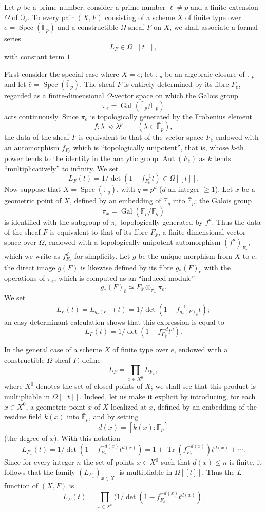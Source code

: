 \documentclass[11pt]{article}
\DeclareMathOperator{\Spec}{Spec}
\providecommand{\Gal}{\operatorname{Gal}}
\providecommand{\Tr}{\operatorname{Tr}}
\providecommand{\Tr}{\operatorname{Tr}}
\providecommand{\Tr}{\operatorname{Tr}}
\providecommand{\Aut}{\operatorname{Aut}}
\providecommand{\Tr}{\operatorname{Tr}}
\providecommand{\Spec}{\operatorname{Spec}}
\providecommand{\Spec}{\operatorname{Spec}}
\providecommand{\Aut}{\operatorname{Aut}}
\providecommand{\Spec}{\operatorname{Spec}}
\providecommand{\Tr}{\operatorname{Tr}}
\providecommand{\Spec}{\operatorname{Spec}}
\providecommand{\Gal}{\operatorname{Gal}}
\begin{document}
Let $p$ be a prime number; consider a prime number $\ell\ne p$ and a finite extension $\Omega$ of $\mathbb Q_\ell$. To every pair $(X,F)$ consisting of a scheme $X$ of finite type over $e=\Spec(\mathbb F_p)$ and a constructible $\Omega$-sheaf $F$ on $X$, we shall associate a formal series
\[
L_F\in\Omega[[t]],
\]
with constant term $1$.


First consider the special case where $X=e$; let $\bar{\mathbb F}_p$ be an algebraic closure of $\mathbb F_p$ and let $\bar e=\Spec(\bar{\mathbb F}_p)$. The sheaf $F$ is entirely determined by its fibre $F_{\bar e}$, regarded as a finite-dimensional $\Omega$-vector space on which the Galois group
\[
\pi_e=\Gal(\bar{\mathbb F}_p/\mathbb F_p)
\]
acts continuously. Since $\pi_e$ is topologically generated by the Frobenius element
\[
f:\lambda\rightsquigarrow\lambda^p\qquad(\lambda\in\bar{\mathbb F}_p),
\]
the data of the sheaf $F$ is equivalent to that of the vector space $F_{\bar e}$ endowed with an automorphism $f_{F_{\bar e}}$ which is ``topologically unipotent'', that is, whose $k$-th power tends to the identity in the analytic group $\Aut(F_{\bar e})$ as $k$ tends ``multiplicatively'' to infinity. We set
\[
L_F(t)=1/\det(1-f_{F_{\bar e}}^{-1}t)\in\Omega[[t]].
\]
Now suppose that $X=\Spec(\mathbb F_q)$, with $q=p^d$ ($d$ an integer $\ge1$). Let $\bar x$ be a geometric point of $X$, defined by an embedding of $\mathbb F_q$ into $\bar{\mathbb F}_p$; the Galois group
\[
\pi_x=\Gal(\bar{\mathbb F}_p/\mathbb F_q)
\]
is identified with the subgroup of $\pi_e$ topologically generated by $f^d$. Thus the data of the sheaf $F$ is equivalent to that of its fibre $F_{\bar x}$, a finite-dimensional vector space over $\Omega$, endowed with a topologically unipotent automorphism $(f^d)_{F_{\bar x}}$, which we write as $f^d_{F_{\bar x}}$ for simplicity. Let $g$ be the unique morphism from $X$ to $e$; the direct image $g(F)$ is likewise defined by its fibre $g_*(F)_{\bar e}$ with the operations of $\pi_e$, which is computed as an ``induced module''
\[
g_*(F)_{\bar e}\simeq F_{\bar x}\otimes_{\pi_x}\pi_e.
\]
We set
\[
L_F(t)=L_{g_*(F)}(t)=1/\det(1-f^{-1}_{g_*(F)_{\bar e}}t);
\]
an easy determinant calculation shows that this expression is equal to
\[
L_F(t)=1/\det(1-f^{-d}_{F_{\bar x}}t^d).
\]

In the general case of a scheme $X$ of finite type over $e$, endowed with a constructible $\Omega$-sheaf $F$, define
\[
L_F=\prod_{x\in X^0}L_{F_x},
\]
where $X^0$ denotes the set of closed points of $X$; we shall see that this product is multipliable in $\Omega[[t]]$. Indeed, let us make it explicit by introducing, for each $x\in X^0$, a geometric point $\bar x$ of $X$ localized at $x$, defined by an embedding of the residue field $k(x)$ into $\bar{\mathbb F}_p$, and by setting
\[
d(x)=[k(x):\mathbb F_p]
\]
(the degree of $x$). With this notation
\[
L_{F_x}(t)=1/\det(1-f_{F_{\bar x}}^{-d(x)}t^{d(x)})
 =1+\Tr(f_{F_{\bar x}}^{-d(x)})t^{d(x)}+\cdots .
\]
Since for every integer $n$ the set of points $x\in X^0$ such that $d(x)\le n$ is finite, it follows that the family $(L_{F_x})_{x\in X^0}$ is multipliable in $\Omega[[t]]$. Thus the $L$-function of $(X,F)$ is
\[
L_F(t)=\prod_{x\in X^0}(1/\det(1-f_{F_{\bar x}}^{-d(x)}t^{d(x)}).
\]
\end{document}
